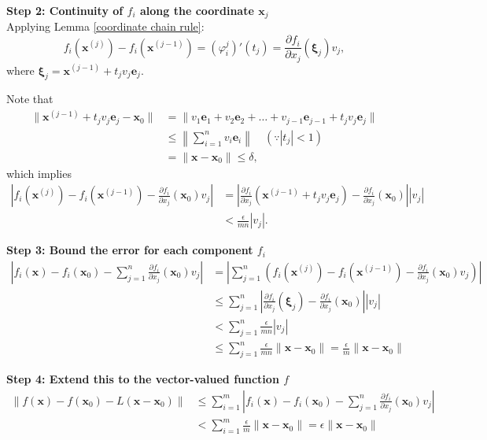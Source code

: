 \begin{pfbox}
\vspace{0.8em}
\noindent \textbf{Step 2: Continuity of $f_i$ along the coordinate $\mathbf{x}_j$}\\
Applying Lemma \eqref{coordinate chain rule}: 
$$
f_i(\mathbf{x}^{(j)}) - f_i(\mathbf{x}^{(j-1)}) = (\varphi^j_i)'(t_j) = \frac{\partial f_i}{\partial x_j}(\boldsymbol{\xi}_j) v_j,
$$ 
where $\boldsymbol{\xi}_j = \mathbf{x}^{(j-1)} + t_j v_j \mathbf{e}_j$. 

Note that
\begin{align*}
\|\mathbf{x}^{(j-1)} + t_j v_j \mathbf{e}_j - \mathbf{x}_0\| &= \|v_1 \mathbf{e}_1 + v_2 \mathbf{e}_2 + \dots + v_{j-1} \mathbf{e}_{j-1} + t_j v_j \mathbf{e}_j\| \\
&\le \left\| \sum_{i=1}^n v_i \mathbf{e}_i \right\| \quad (\because |t_j| < 1) \\
&= \|\mathbf{x} - \mathbf{x}_0\| \le \delta,
\end{align*}
which implies
\begin{align*}
\left| f_i(\mathbf{x}^{(j)}) - f_i(\mathbf{x}^{(j-1)}) - \frac{\partial f_i}{\partial x_j}(\mathbf{x}_0) v_j \right| 
&= \left| \frac{\partial f_i}{\partial x_j}(\mathbf{x}^{(j-1)} + t_j v_j \mathbf{e}_j) - \frac{\partial f_i}{\partial x_j}(\mathbf{x}_0) \right| |v_j| \\
&< \frac{\epsilon}{mn} |v_j|.
\end{align*}

\vspace{0.8em}
\noindent \textbf{Step 3: Bound the error for each component $f_i$}\\
\begin{align*}
\left| f_i(\mathbf{x}) - f_i(\mathbf{x}_0) - \sum_{j=1}^n \frac{\partial f_i}{\partial x_j}(\mathbf{x}_0) v_j \right| &= \left| \sum_{j=1}^n \left( f_i(\mathbf{x}^{(j)}) - f_i(\mathbf{x}^{(j-1)}) - \frac{\partial f_i}{\partial x_j}(\mathbf{x}_0) v_j \right) \right| \\
&\le \sum_{j=1}^n \left| \frac{\partial f_i}{\partial x_j}(\boldsymbol{\xi}_j) - \frac{\partial f_i}{\partial x_j}(\mathbf{x}_0) \right| |v_j| \\
&< \sum_{j=1}^n \frac{\epsilon}{mn} |v_j| \\
&\le \sum_{j=1}^n \frac{\epsilon}{mn} \|\mathbf{x} - \mathbf{x}_0\| = \frac{\epsilon}{m} \|\mathbf{x} - \mathbf{x}_0\|
\end{align*}

\vspace{0.8em}
\noindent \textbf{Step 4: Extend this to the vector-valued function $f$}\\
\begin{align*}
\|f(\mathbf{x}) - f(\mathbf{x}_0) - L(\mathbf{x} - \mathbf{x}_0)\| &\le \sum_{i=1}^m \left| f_i(\mathbf{x}) - f_i(\mathbf{x}_0) - \sum_{j=1}^n \frac{\partial f_i}{\partial x_j}(\mathbf{x}_0) v_j \right| \\
&< \sum_{i=1}^m \frac{\epsilon}{m} \|\mathbf{x} - \mathbf{x}_0\| = \epsilon \|\mathbf{x} - \mathbf{x}_0\|
\end{align*}


\end{pfbox}
